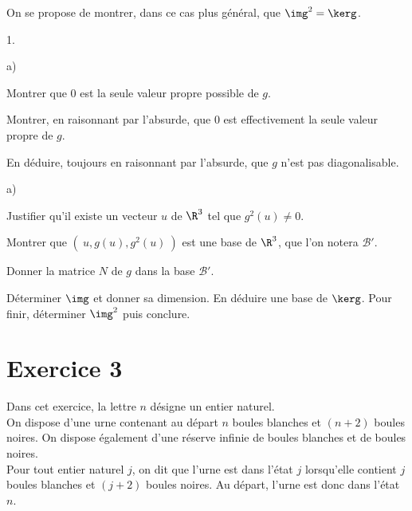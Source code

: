 \documentclass[11pt]{article}%
\begin{document}
On se propose de montrer, dans ce cas plus général, que $\img^{2} =
\kerg$. \\

\begin{noliste}{1.}
 \setlength{\itemsep}{4mm}

\item \begin{noliste}{a)}
 \setlength{\itemsep}{2mm}

\item Montrer que 0 est la seule valeur propre possible de $g$. 

\item Montrer, en raisonnant par l'absurde, que 0 est effectivement la
seule valeur propre de $g$.

\item En déduire, toujours en raisonnant par l'absurde, que $g$ n'est
pas diagonalisable. \\

\end{noliste}

\item \begin{noliste}{a)}
 \setlength{\itemsep}{2mm}

\item Justifier qu'il existe un vecteur $u$ de $\R^{3}$ tel que
$g^{2}(u) \neq 0$.

\item Montrer que $( \ u, g(u), g^{2}(u) \ )$ est une base de $\R^{3}$,
que l'on notera $\mathcal{B}'$.

\item Donner la matrice $N$ de $g$ dans la base $\mathcal{B}'$.

\item Déterminer $\img$ et donner sa dimension. En déduire une base de
$\kerg$. Pour finir, déterminer $\img^{2}$ puis conclure.

\end{noliste}

\end{noliste}

\section*{Exercice 3}

\noindent Dans cet exercice, la lettre $n$ désigne un entier naturel.
\\
On dispose d'une urne contenant au départ $n$ boules blanches et $(n +
2)$ boules noires. On dispose également d'une réserve infinie de boules
blanches et de boules noires. \\
Pour tout entier naturel $j$, on dit que l'urne est dans l'état $j$
lorsqu'elle contient $j$ boules blanches et $(j + 2)$ boules noires. Au
départ, l'urne est donc dans l'état $n$. \\
\end{document}
